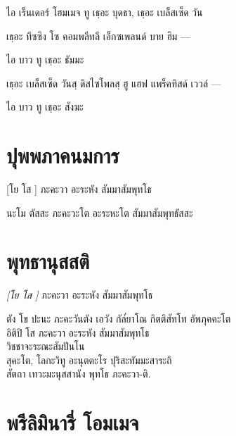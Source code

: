 \begin{english}
ไอ เร็นเดอร์ โฮมเมจ ทู เธฺอะ บุดธา, เธฺอะ เบล็สเซ็ด วัน 
\end{english}

เธฺอะ ทีซซิง โซ คอมพลีทลี เอ็กซเพลนด์ บาย ฮิม —

\begin{english}
ไอ บาว ทู เธฺอะ ธัมมะ 
\end{english}

เธฺอะ เบล็สเซ็ด วันสฺ ดิสไซโพลสฺ ฮู แฮฟ แพร็คทิสด์ เววล์ —

\begin{english}
ไอ บาว ทู เธฺอะ สังฆะ 
\end{english}

\chapter*{ปุพพภาคนมการ}
\delegateSetUseNext

[โย โส ] ภะคะวา อะระหัง สัมมาสัมพุทโธ\\
\begin{leader}
\end{leader}

นะโม ตัสสะ ภะคะวะโต อะระหะโต สัมมาสัมพุทธัสสะ 

\chapter*{พุทธานุสสติ}
\delegateSetUseNext

\textit{[โย โส ]} ภะคะวา อะระหัง สัมมาสัมพุทโธ\\

\begin{leader}
\end{leader}

ตัง โข ปะนะ ภะคะวันตัง เอวัง กัล๎ยาโณ กิตติสัทโท อัพภุคคะโต\\
อิติปิ โส ภะคะวา อะระหัง สัมมาสัมพุทโธ\\
วิชชาจะระณะสัมปันโน\\
สุคะโต, โลกะวิทู อะนุตตะโร ปุริสะทัมมะสาระถิ\\
สัตถา เทวะมะนุสสานัง พุทโธ ภะคะวา-ติ.\\

\chapter{พรีลิมินารี่ โอมเมจ}

